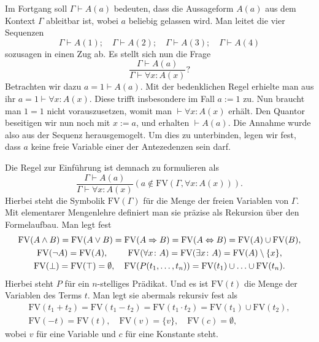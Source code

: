 Im Fortgang soll $\Gamma\vdash A(a)$ bedeuten, dass die Aussageform
$A(a)$ aus dem Kontext $\Gamma$ ableitbar ist, wobei $a$ beliebig
gelassen wird. Man leitet die vier Sequenzen
\[\Gamma\vdash A(1);\quad\Gamma\vdash A(2);\quad\Gamma\vdash A(3);
\quad\Gamma\vdash A(4)\]
sozusagen in einen Zug ab. Es stellt sich nun die Frage
\[\dfrac{\Gamma\vdash A(a)}{\Gamma\vdash\forall x\colon A(x)}?\]
Betrachten wir dazu $a=1\vdash A(a)$. Mit der bedenklichen Regel erhielte
man aus ihr $a=1\vdash\forall x\colon A(x)$. Diese trifft insbesondere
im Fall $a:=1$ zu. Nun braucht man $1=1$ nicht vorauszusetzen, womit
man $\vdash\forall x\colon A(x)$ erhält. Den Quantor beseitigen
wir nun noch mit $x:=a$, und erhalten $\vdash A(a)$. Die Annahme
wurde also aus der Sequenz herausgemogelt. Um dies zu unterbinden,
legen wir fest, dass $a$ keine freie Variable einer der Antezedenzen
sein darf.

Die Regel zur Einführung ist demnach zu formulieren als
\[\dfrac{\Gamma\vdash A(a)}{\Gamma\vdash\forall x\colon A(x)}
(a\notin\mathrm{FV}(\Gamma,\forall x\colon A(x))).\]
Hierbei steht die Symbolik $\mathrm{FV}(\Gamma)$ für die Menge der
freien Variablen von $\Gamma$. Mit elementarer Mengenlehre definiert
man sie präzise als Rekursion über den Formelaufbau. Man legt fest
\begin{gather*}
\mathrm{FV}(A\land B) = \mathrm{FV}(A\lor B)
= \mathrm{FV}(A\Rightarrow B) = \mathrm{FV}(A\Leftrightarrow B)
= \mathrm{FV}(A)\cup\mathrm{FV}(B),\\
\mathrm{FV}(\lnot A) = \mathrm{FV}(A),\quad
\hspace{13pt}\mathrm{FV}(\forall x\colon A) = \mathrm{FV}(\exists x\colon A)
= \mathrm{FV}(A)\setminus\{x\},\\
\mathrm{FV}(\bot) = \mathrm{FV}(\top) = \emptyset,\quad
\mathrm{FV}(P(t_1,\ldots,t_n)) = \mathrm{FV}(t_1)\cup\ldots\cup\mathrm{FV}(t_n).
\end{gather*}
Hierbei steht $P$ für ein $n$-stelliges Prädikat. Und es ist $\mathrm{FV}(t)$
die Menge der Variablen des Terms $t$. Man legt sie abermals
rekursiv fest als
\begin{gather*}
\mathrm{FV}(t_1+t_2) = \mathrm{FV}(t_1-t_2) = \mathrm{FV}(t_1\cdot t_2)
= \mathrm{FV}(t_1)\cup\mathrm{FV}(t_2),\\
\mathrm{FV}(-t)=\mathrm{FV}(t),\quad
\mathrm{FV}(v)=\{v\},\quad\mathrm{FV}(c) = \emptyset,
\end{gather*}
wobei $v$ für eine Variable und $c$ für eine Konstante steht.

